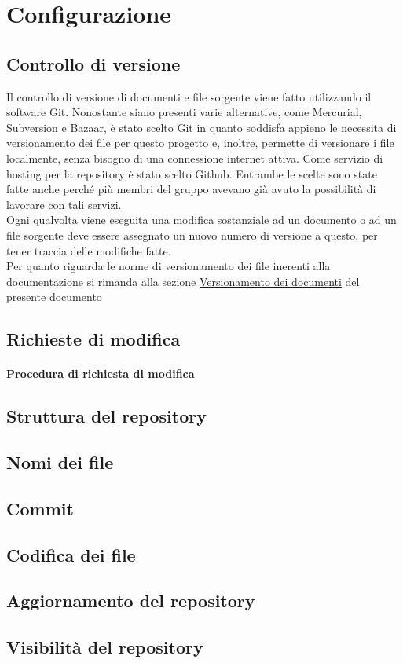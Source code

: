 \documentclass[../NormeProgetto.tex]{subfiles}
\begin{document}
	\section{Configurazione}
	\subsection{Controllo di versione}
	Il controllo di versione di documenti e file sorgente viene fatto utilizzando il software Git. Nonostante siano presenti varie alternative, come Mercurial, Subversion e Bazaar, è stato scelto Git in quanto soddisfa appieno le necessita di versionamento dei file per questo progetto e, inoltre, permette di versionare i file localmente, senza bisogno di una connessione internet attiva. Come servizio di hosting per la repository è stato scelto Github. Entrambe le scelte sono state fatte anche perché più membri del gruppo avevano già avuto la possibilità di lavorare con tali servizi. \\ Ogni qualvolta viene eseguita una modifica sostanziale ad un documento o ad un file sorgente deve essere assegnato un nuovo numero di versione a questo, per tener traccia delle modifiche fatte. \\ Per quanto riguarda le norme di versionamento dei file inerenti alla documentazione si rimanda alla sezione \hyperref[sec:Versionamento dei documenti]{Versionamento dei documenti} del presente documento
\subsection{Richieste di modifica}
\paragraph{Procedura di richiesta di modifica}
\subsection{Struttura del repository}
\subsection{Nomi dei file}
\subsection{Commit}
\subsection{Codifica dei file}
\subsection{Aggiornamento del repository}
\subsection{Visibilità del repository}
\end{document}
